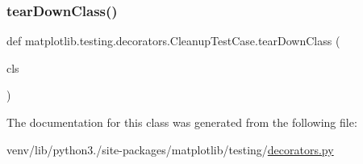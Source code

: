\subsubsection{\texorpdfstring{tear\+Down\+Class()}{tearDownClass()}}
{\footnotesize\ttfamily def matplotlib.\+testing.\+decorators.\+Cleanup\+Test\+Case.\+tear\+Down\+Class (\begin{DoxyParamCaption}\item[{}]{cls }\end{DoxyParamCaption})}



The documentation for this class was generated from the following file\+:\begin{DoxyCompactItemize}
\item 
venv/lib/python3./site-\/packages/matplotlib/testing/\hyperlink{matplotlib_2testing_2decorators_8py}{decorators.\+py}\end{DoxyCompactItemize}
